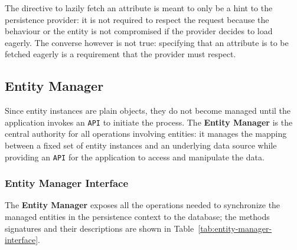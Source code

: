 \documentclass[english]{article}
\begin{document}
The directive to lazily fetch an attribute is meant to only be a hint to the persistence provider:
it is not required to respect the request because the behaviour or the entity is not compromised if the provider decides to load eagerly.
The converse however is not true: specifying that an attribute is to be fetched eagerly is a requirement that the provider must respect.

\subsection{Entity Manager}

Since entity instances are plain \java objects, they do not become managed until the application invokes an \texttt{API} to initiate the process.
The \textbf{Entity Manager} is the central authority for all operations involving entities:
it manages the mapping between a fixed set of entity instances and an underlying data source while providing an \texttt{API} for the application to access and manipulate the data.

\subsubsection{Entity Manager Interface}

The \textbf{Entity Manager} exposes all the operations needed to synchronize the managed entities in the persistence context to the database;
the methods signatures and their descriptions are shown in Table~\ref{tab:entity-manager-interface}.
\end{document}
